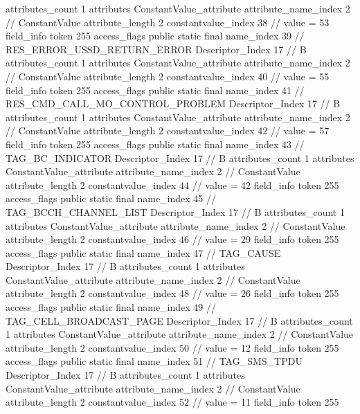 {{{{{				attributes_count	1
				attributes {
				ConstantValue_attribute {
					attribute_name_index	2		// ConstantValue
					attribute_length	2
					constantvalue_index	38		// value = 53
				}
				}
			}
			field_info {
				token	255
				access_flags	public static final
				name_index	39		// RES_ERROR_USSD_RETURN_ERROR
				Descriptor_Index	17		// B
				attributes_count	1
				attributes {
				ConstantValue_attribute {
					attribute_name_index	2		// ConstantValue
					attribute_length	2
					constantvalue_index	40		// value = 55
				}
				}
			}
			field_info {
				token	255
				access_flags	public static final
				name_index	41		// RES_CMD_CALL_MO_CONTROL_PROBLEM
				Descriptor_Index	17		// B
				attributes_count	1
				attributes {
				ConstantValue_attribute {
					attribute_name_index	2		// ConstantValue
					attribute_length	2
					constantvalue_index	42		// value = 57
				}
				}
			}
			field_info {
				token	255
				access_flags	public static final
				name_index	43		// TAG_BC_INDICATOR
				Descriptor_Index	17		// B
				attributes_count	1
				attributes {
				ConstantValue_attribute {
					attribute_name_index	2		// ConstantValue
					attribute_length	2
					constantvalue_index	44		// value = 42
				}
				}
			}
			field_info {
				token	255
				access_flags	public static final
				name_index	45		// TAG_BCCH_CHANNEL_LIST
				Descriptor_Index	17		// B
				attributes_count	1
				attributes {
				ConstantValue_attribute {
					attribute_name_index	2		// ConstantValue
					attribute_length	2
					constantvalue_index	46		// value = 29
				}
				}
			}
			field_info {
				token	255
				access_flags	public static final
				name_index	47		// TAG_CAUSE
				Descriptor_Index	17		// B
				attributes_count	1
				attributes {
				ConstantValue_attribute {
					attribute_name_index	2		// ConstantValue
					attribute_length	2
					constantvalue_index	48		// value = 26
				}
				}
			}
			field_info {
				token	255
				access_flags	public static final
				name_index	49		// TAG_CELL_BROADCAST_PAGE
				Descriptor_Index	17		// B
				attributes_count	1
				attributes {
				ConstantValue_attribute {
					attribute_name_index	2		// ConstantValue
					attribute_length	2
					constantvalue_index	50		// value = 12
				}
				}
			}
			field_info {
				token	255
				access_flags	public static final
				name_index	51		// TAG_SMS_TPDU
				Descriptor_Index	17		// B
				attributes_count	1
				attributes {
				ConstantValue_attribute {
					attribute_name_index	2		// ConstantValue
					attribute_length	2
					constantvalue_index	52		// value = 11
				}
				}
			}
			field_info {
				token	255
}}}}}
